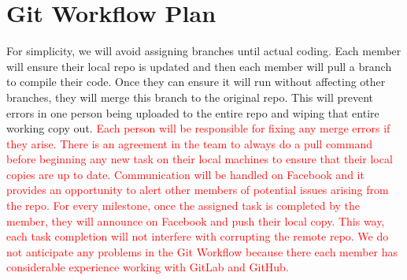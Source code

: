 \documentclass{article}
\begin{document}
\section{Git Workflow Plan}
\smallskip
For simplicity, we will avoid assigning branches until actual coding. Each member will ensure their local repo is updated and then each member will pull a branch to compile their code. Once they can ensure it will run without affecting other branches, they will merge this branch to the original repo. This will prevent errors in one person being uploaded to the entire repo and wiping that entire working copy out. \textcolor{red}{Each person will be responsible for fixing any merge errors if they arise.  There is an agreement in the team to always do a pull command before beginning any new task on their local machines to ensure that their local copies are up to date. Communication will be handled on Facebook and it provides an opportunity to alert other members of potential issues arising from the repo. For every milestone, once the assigned task is completed by the member, they will announce on Facebook and push their local copy. This way, each task completion will not interfere with corrupting the remote repo. We do not anticipate any problems in the Git Workflow because there each member has considerable experience working with GitLab and GitHub.}
\end{document}
